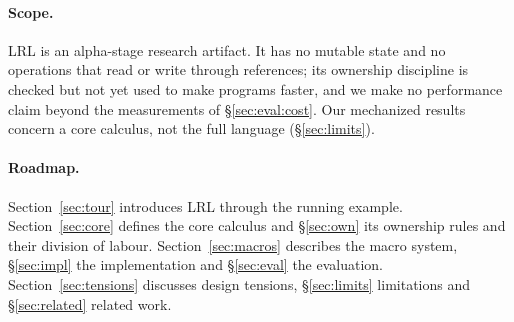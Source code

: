 \paragraph{Scope.}
LRL is an alpha-stage research artifact.
It has no mutable state and no operations that read or write through references; its ownership discipline is checked but not yet used to make programs faster, and we make no performance claim beyond the measurements of \S\ref{sec:eval:cost}.
Our mechanized results concern a core calculus, not the full language (\S\ref{sec:limits}).

\paragraph{Roadmap.}
Section~\ref{sec:tour} introduces LRL through the running example.
Section~\ref{sec:core} defines the core calculus and \S\ref{sec:own} its ownership rules and their division of labour.
Section~\ref{sec:macros} describes the macro system, \S\ref{sec:impl} the implementation and \S\ref{sec:eval} the evaluation.
Section~\ref{sec:tensions} discusses design tensions, \S\ref{sec:limits} limitations and \S\ref{sec:related} related work.
